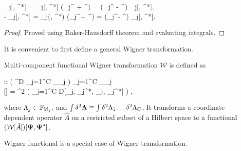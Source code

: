 \begin{lemma}
\label{lmm:func-wigner:displacement-derivatives}
	\begin{eqn*}
		\frac{\delta}{\delta \Lambda^\prime} _j[\Lambda, \Lambda^*]
		= _j[\Lambda, \Lambda^*] (\Psiop_j^{\prime\dagger} +  \Lambda^{\prime*})
		= (\Psiop_j^{\prime\dagger} -  \Lambda^{\prime*}) _j[\Lambda, \Lambda^*], \\
		-\frac{\delta}{\delta \Lambda^{\prime*}} _j[\Lambda, \Lambda^*]
		= _j(\Lambda, \Lambda^*) (\Psiop_j^\prime +  \Lambda^\prime)
		= (\Psiop_j^\prime -  \Lambda^\prime) _j[\Lambda, \Lambda^*].
	\end{eqn*}
\end{lemma}
\begin{proof}
Proved using Baker-Hausdorff theorem and evaluating integrals.
\end{proof}

It is convenient to first define a general Wigner transformation.

\begin{definition}
\label{def:func-wigner:w-transformation}
	Multi-component functional Wigner transformation $\mathcal{W}$ is defined as
	\begin{eqn*}
		 :: \left( ^D \rightarrow \prod_{j=1}^C _{\restbasis_j} \right)
			\rightarrow \prod_{j=1}^C _{\restbasis_j}
			\rightarrow \mathbb{C} \\
		[\hat{A}]
		=  \int \delta^2 \bLambda
			\left( \prod_{j=1}^C D[\Lambda_j, \Lambda_j^*, \Psi_j, \Psi_j^*] \right)
			\Trace{ \hat{A} \prod_{j=1}^C \hat{D}_j[\Lambda_j, \Lambda_j^*] },
	\end{eqn*}
	where $\Lambda_j \in \mathbb{F}_{\restbasis_j}$, and $\int \delta^2 \bLambda \equiv \int \delta^2 \Lambda_1 \ldots \delta^2 \Lambda_C$.
	It transforms a coordinate-dependent operator $$ on a restricted subset of a Hilbert space to a functional $(\mathcal{W}[\hat{A}])[\bPsi, \bPsi^*]$.
\end{definition}

Wigner functional is a special case of Wigner transformation.

